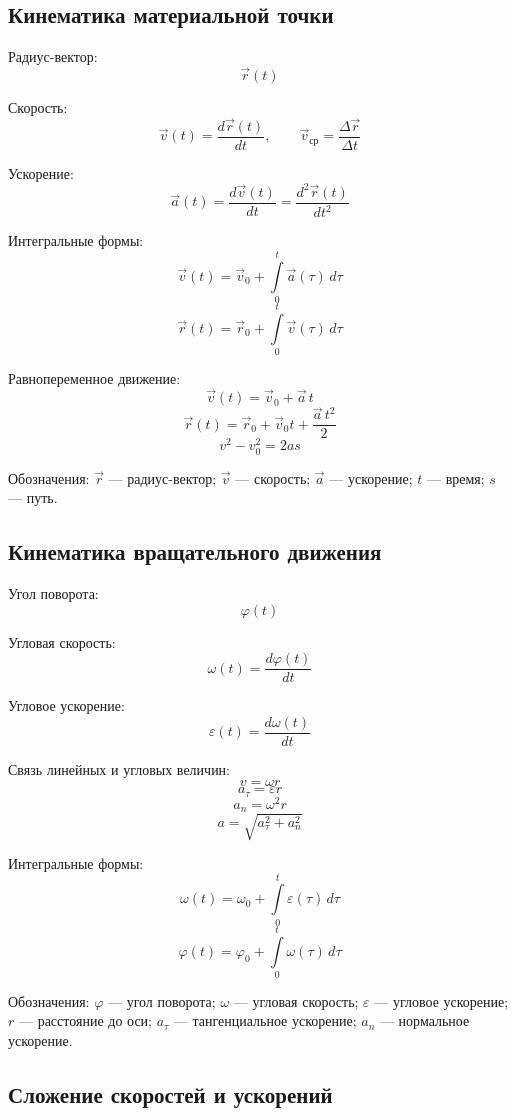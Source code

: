 \documentclass[a4paper,12pt]{article}
\begin{document}
\subsection{Кинематика материальной точки}

Радиус-вектор:
\[
\vec r\left(t\right)
\]

Скорость:
\[
\vec v\left(t\right) = \frac{d\vec r\left(t\right)}{dt}, \qquad
\vec v_{\text{ср}} = \frac{\Delta \vec r}{\Delta t}
\]

Ускорение:
\[
\vec a\left(t\right) = \frac{d\vec v\left(t\right)}{dt}
= \frac{d^2 \vec r\left(t\right)}{dt^2}
\]

Интегральные формы:
\[
\vec v\left(t\right) = \vec v_0 + \int\limits_{0}^{t} \vec a\left(\tau\right)\, d\tau
\]
\[
\vec r\left(t\right) = \vec r_0 + \int\limits_{0}^{t} \vec v\left(\tau\right)\, d\tau
\]

Равнопеременное движение:
\[
\vec v\left(t\right) = \vec v_0 + \vec a\, t
\]
\[
\vec r\left(t\right) = \vec r_0 + \vec v_0 t + \frac{\vec a\, t^2}{2}
\]
\[
v^2 - v_0^2 = 2 a s
\]


Обозначения:  
\(\vec r\) — радиус-вектор;  
\(\vec v\) — скорость;  
\(\vec a\) — ускорение;  
\(t\) — время;  
\(s\) — путь.

\subsection{Кинематика вращательного движения}

Угол поворота:
\[
\varphi\left(t\right)
\]

Угловая скорость:
\[
\omega\left(t\right) = \frac{d\varphi\left(t\right)}{dt}
\]

Угловое ускорение:
\[
\varepsilon\left(t\right) = \frac{d\omega\left(t\right)}{dt}
\]

Связь линейных и угловых величин:
\[
v = \omega r
\]
\[
a_{\tau} = \varepsilon r
\]
\[
a_{n} = \omega^2 r
\]
\[
a = \sqrt{a_{\tau}^2 + a_{n}^2}
\]

Интегральные формы:
\[
\omega\left(t\right) = \omega_0 + \int\limits_{0}^{t} \varepsilon\left(\tau\right)\, d\tau
\]
\[
\varphi\left(t\right) = \varphi_0 + \int\limits_{0}^{t} \omega\left(\tau\right)\, d\tau
\]

Обозначения:  
\(\varphi\) — угол поворота;  
\(\omega\) — угловая скорость;  
\(\varepsilon\) — угловое ускорение;  
\(r\) — расстояние до оси;  
\(a_{\tau}\) — тангенциальное ускорение;  
\(a_n\) — нормальное ускорение.

\subsection{Сложение скоростей и ускорений}
\end{document}
